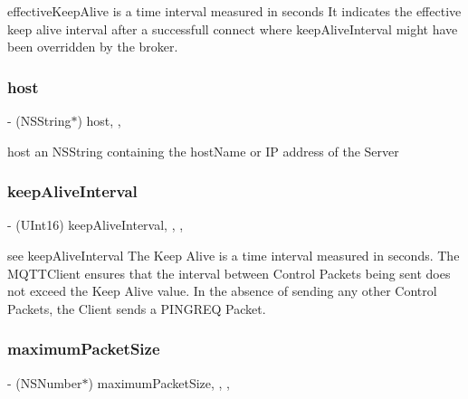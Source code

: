 effective\+Keep\+Alive is a time interval measured in seconds It indicates the effective keep alive interval after a successfull connect where keep\+Alive\+Interval might have been overridden by the broker. \mbox{\label{interface_m_q_t_t_session_a72a66b7bf08ab39c71369dc6debf5853}} 
\subsubsection{\texorpdfstring{host}{host}}
{\footnotesize\ttfamily -\/ (N\+S\+String$\ast$) host\hspace{0.3cm}{\ttfamily [read]}, {\ttfamily [atomic]}, {\ttfamily [assign]}}

host an N\+S\+String containing the host\+Name or IP address of the Server \mbox{\label{interface_m_q_t_t_session_aa63e148680fef0724b66218d53caba6d}} 
\subsubsection{\texorpdfstring{keep\+Alive\+Interval}{keepAliveInterval}}
{\footnotesize\ttfamily -\/ (U\+Int16) keep\+Alive\+Interval\hspace{0.3cm}{\ttfamily [read]}, {\ttfamily [write]}, {\ttfamily [nonatomic]}, {\ttfamily [assign]}}

see keep\+Alive\+Interval The Keep Alive is a time interval measured in seconds. The M\+Q\+T\+T\+Client ensures that the interval between Control Packets being sent does not exceed the Keep Alive value. In the absence of sending any other Control Packets, the Client sends a P\+I\+N\+G\+R\+EQ Packet. \mbox{\label{interface_m_q_t_t_session_a5f760a87b7c349e612e103f0147b516b}} 
\subsubsection{\texorpdfstring{maximum\+Packet\+Size}{maximumPacketSize}}
{\footnotesize\ttfamily -\/ (N\+S\+Number$\ast$) maximum\+Packet\+Size\hspace{0.3cm}{\ttfamily [read]}, {\ttfamily [write]}, {\ttfamily [nonatomic]}, {\ttfamily [strong]}}

